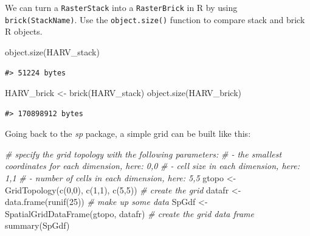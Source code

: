 \documentclass[
  11pt,
]{book}
\newenvironment{Shaded}{\begin{snugshade}}{\end{snugshade}}
\newcommand{\CommentTok}[1]{\textcolor[rgb]{0.56,0.35,0.01}{\textit{#1}}}
\newcommand{\DecValTok}[1]{\textcolor[rgb]{0.00,0.00,0.81}{#1}}
\newcommand{\FunctionTok}[1]{\textcolor[rgb]{0.00,0.00,0.00}{#1}}
\newcommand{\NormalTok}[1]{#1}
\newcommand{\OtherTok}[1]{\textcolor[rgb]{0.56,0.35,0.01}{#1}}
\begin{document}
We can turn a \texttt{RasterStack} into a \texttt{RasterBrick} in R by using \texttt{brick(StackName)}. Use the \texttt{object.size()} function to compare stack and brick R objects.

\begin{Shaded}
\begin{Highlighting}[]
\FunctionTok{object.size}\NormalTok{(HARV\_stack)}
\end{Highlighting}
\end{Shaded}

\begin{verbatim}
#> 51224 bytes
\end{verbatim}

\begin{Shaded}
\begin{Highlighting}[]
\NormalTok{HARV\_brick }\OtherTok{\textless{}{-}} \FunctionTok{brick}\NormalTok{(HARV\_stack)}
\FunctionTok{object.size}\NormalTok{(HARV\_brick)}
\end{Highlighting}
\end{Shaded}

\begin{verbatim}
#> 170898912 bytes
\end{verbatim}

Going back to the \emph{sp} package, a simple grid can be built like this:

\begin{Shaded}
\begin{Highlighting}[]
\CommentTok{\# specify the grid topology with the following parameters:}
\CommentTok{\# {-} the smallest coordinates for each dimension, here: 0,0}
\CommentTok{\# {-} cell size in each dimension, here: 1,1 }
\CommentTok{\# {-} number of cells in each dimension, here: 5,5}
\NormalTok{gtopo }\OtherTok{\textless{}{-}} \FunctionTok{GridTopology}\NormalTok{(}\FunctionTok{c}\NormalTok{(}\DecValTok{0}\NormalTok{,}\DecValTok{0}\NormalTok{), }\FunctionTok{c}\NormalTok{(}\DecValTok{1}\NormalTok{,}\DecValTok{1}\NormalTok{), }\FunctionTok{c}\NormalTok{(}\DecValTok{5}\NormalTok{,}\DecValTok{5}\NormalTok{)) }\CommentTok{\# create the grid}
\NormalTok{datafr }\OtherTok{\textless{}{-}} \FunctionTok{data.frame}\NormalTok{(}\FunctionTok{runif}\NormalTok{(}\DecValTok{25}\NormalTok{)) }\CommentTok{\# make up some data}
\NormalTok{SpGdf }\OtherTok{\textless{}{-}} \FunctionTok{SpatialGridDataFrame}\NormalTok{(gtopo, datafr) }\CommentTok{\# create the grid data frame}
\FunctionTok{summary}\NormalTok{(SpGdf)}
\end{Highlighting}
\end{Shaded}
\end{document}
